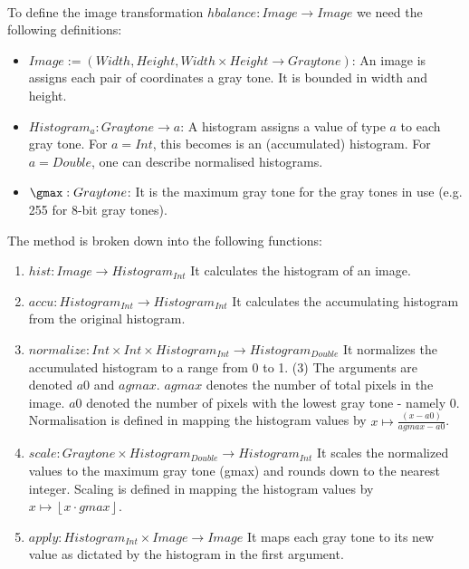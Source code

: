       \paragraph{}
      To define the image transformation $ hbalance: Image \rightarrow Image$ we need the following definitions:
      \begin{itemize}
        \item $Image := (Width,Height,Width \times Height \rightarrow Graytone)$:
          An image is assigns each pair of coordinates a gray tone. It is bounded in width and height.
        \item $Histogram_a: Graytone \rightarrow a$:
          A histogram assigns a value of type $a$ to each gray tone. For $a = Int$,
          this becomes is an (accumulated) histogram. For $a = Double$, one can
          describe normalised histograms.
        \item $\gmax: Graytone$:
          It is the maximum gray tone for the gray tones in use (e.g. 255 for 8-bit gray tones).
      \end{itemize}
      
      The method is broken down into the following functions:
      
      \begin{enumerate}
        \item $hist: Image \rightarrow Histogram_{Int}$
          It calculates the histogram of an image.
        \item $accu: Histogram_{Int} \rightarrow Histogram_{Int}$
          It calculates the accumulating histogram from the original histogram.
        \item $normalize: Int \times Int \times Histogram_{Int} \rightarrow Histogram_{Double}$
          It normalizes the accumulated histogram
          to a range from 0 to 1. (3)
          The arguments are denoted $a0$ and $agmax$.
          $agmax$ denotes the number of total pixels in the image.
          $a0$ denoted the number of pixels with the lowest gray tone - namely 0.
          Normalisation is defined in mapping the histogram values by $x \mapsto \frac{(x - a0)}{agmax - a0}$.
        \item $scale: Graytone \times Histogram_{Double} \rightarrow Histogram_{Int}$
          It scales the normalized values to the maximum gray tone (gmax) and rounds down to the nearest integer.
          Scaling is defined in mapping the histogram values by $x \mapsto \left \lfloor{x \cdot gmax}\right \rfloor $.
        \item $apply: Histogram_{Int} \times Image \rightarrow Image$
          It maps each gray tone to its new value as dictated by the histogram in the first argument.
      \end{enumerate}
      
